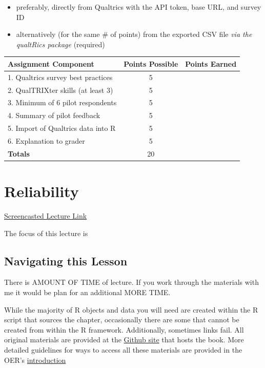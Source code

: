 \documentclass[
  english,
]{book}
\providecommand{\tightlist}{%
  \setlength{\itemsep}{0pt}\setlength{\parskip}{0pt}}
\begin{document}
\begin{itemize}
  \begin{itemize}
  \tightlist
  \item
    preferably, directly from Qualtrics with the API token, base URL, and survey ID
  \item
    alternatively (for the same \# of points) from the exported CSV file \emph{via the qualtRics package} (required)
  \end{itemize}
\end{itemize}

\begin{longtable}[]{@{}lcc@{}}
\toprule
Assignment Component & Points Possible & Points Earned \\
\midrule
\endhead
1. Qualtrics survey best practices & 5 & \\
2. QualTRIXter skills (at least 3) & 5 & \\
3. Minimum of 6 pilot respondents & 5 & \\
4. Summary of pilot feedback & 5 & \\
5. Import of Qualtrics data into R & 5 & \\
6. Explanation to grader & 5 & \\
\textbf{Totals} & 20 & \\
\bottomrule
\end{longtable}

\hypertarget{rxx}{%
\chapter{Reliability}\label{rxx}}

\href{link}{Screencasted Lecture Link}

The focus of this lecture is

\hypertarget{navigating-this-lesson-2}{%
\section{Navigating this Lesson}\label{navigating-this-lesson-2}}

There is AMOUNT OF TIME of lecture. If you work through the materials with me it would be plan for an additional MORE TIME.

While the majority of R objects and data you will need are created within the R script that sources the chapter, occasionally there are some that cannot be created from within the R framework. Additionally, sometimes links fail. All original materials are provided at the \href{https://github.com/lhbikos/ReC_Psychometrics}{Github site} that hosts the book. More detailed guidelines for ways to access all these materials are provided in the OER's \protect\hyperlink{ReCintro}{introduction}
\end{document}
